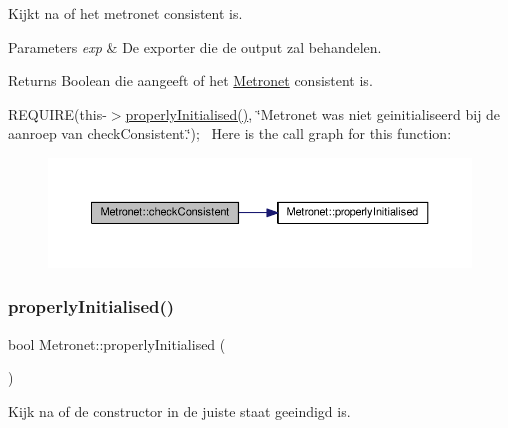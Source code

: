 Kijkt na of het metronet consistent is. 


\begin{DoxyParams}{Parameters}
{\em exp} & De exporter die de output zal behandelen. \\
\hline
\end{DoxyParams}
\begin{DoxyReturn}{Returns}
Boolean die aangeeft of het \hyperlink{class_metronet}{Metronet} consistent is.
\end{DoxyReturn}
R\+E\+Q\+U\+I\+RE(this-\/$>$\hyperlink{class_metronet_a3d2adce29a947f162924279b766de645}{properly\+Initialised()}, \char`\"{}\+Metronet was niet geinitialiseerd bij de aanroep van check\+Consistent.\char`\"{});~\newline
Here is the call graph for this function\+:\nopagebreak
\begin{figure}[H]
\begin{center}
\leavevmode
\includegraphics[width=350pt]{class_metronet_a0128de167ec0a36e70abd57170b3faed_cgraph}
\end{center}
\end{figure}
\mbox{\label{class_metronet_a3d2adce29a947f162924279b766de645}} 
\subsubsection{\texorpdfstring{properly\+Initialised()}{properlyInitialised()}}
{\footnotesize\ttfamily bool Metronet\+::properly\+Initialised (\begin{DoxyParamCaption}{ }\end{DoxyParamCaption})}



Kijk na of de constructor in de juiste staat geeindigd is. 


